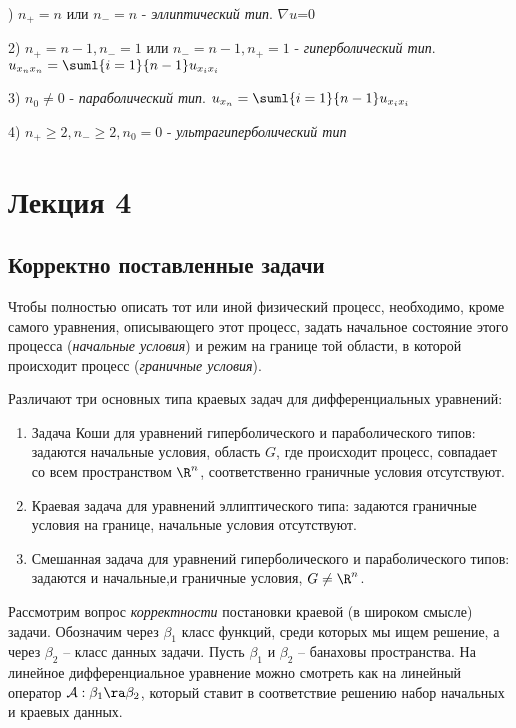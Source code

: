 \documentclass[a4paper,draft]{article}
\begin{document}
) $n_+=n$ или $n_-=n$ - \textit{эллиптический тип}.  $\nabla u$=0

2) $n_+=n-1,n_-=1$ или $n_-=n-1,n_+=1$ - \textit{гиперболический
тип}.  $u_{x_nx_n}=\suml{i=1}{n-1}u_{x_ix_i}$

3) $n_0\neq 0$  - \textit{параболический тип}.
$u_{x_n}=\suml{i=1}{n-1}u_{x_ix_i}$

4) $n_+\ge 2, n_-\ge 2, n_0 = 0$ - \textit{ультрагиперболический
тип}








\section{Лекция 4}
\subsection*{Корректно поставленные задачи}
Чтобы полностью описать тот или иной физический
процесс, необходимо, кроме самого уравнения, описывающего этот
процесс, задать начальное состояние этого процесса
(\emph{начальные условия}) и режим на границе той области, в
которой происходит процесс (\emph{граничные условия}).

Различают три основных типа краевых задач для дифференциальных
уравнений:

\begin{enumerate}
\item Задача Коши для уравнений гиперболического и параболического
типов: задаются начальные условия, область $G$, где происходит
процесс, совпадает со всем пространством $\R^n$,
соответственно граничные условия отсутствуют.
\item Краевая задача для уравнений эллиптического типа: задаются
граничные условия на границе, начальные условия отсутствуют.
\item Смешанная задача для уравнений гиперболического и параболического
типов: задаются и начальные,и граничные условия,
$G\neq\R^n$.
\end{enumerate}

Рассмотрим вопрос \emph{корректности} постановки краевой (в
широком смысле) задачи. Обозначим через $\beta_1$ класс функций,
среди которых мы ищем решение, а через $\beta_2$ -- класс данных
задачи. Пусть $\beta_1$ и $\beta_2$ -- банаховы пространства. На
линейное дифференциальное уравнение можно смотреть как на линейный
оператор $\mathcal{A}:\beta_1\ra\beta_2$, который ставит в
соответствие решению набор начальных и краевых данных.
\end{document}
